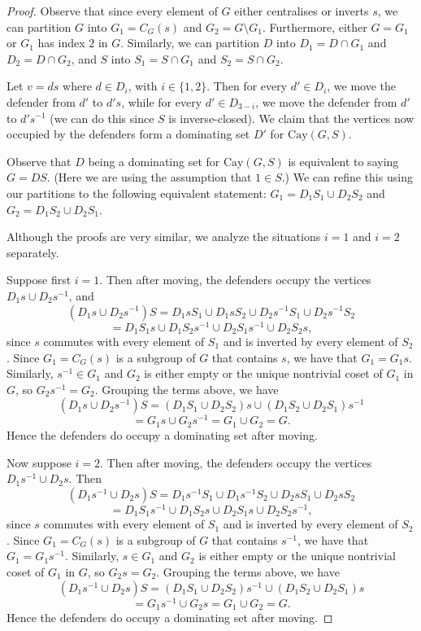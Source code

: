 \documentclass[10pt,a4paper]{amsart}
\newcommand{\Cay}[2]{\mathrm{Cay}(#1,#2)}		%
\begin{document}
\begin{proof}
    Observe that since every element of $G$ either centralises or inverts $s$, we can partition $G$ into $G_1=C_G(s)$ and $G_2=G \setminus G_1$. Furthermore, either $G=G_1$ or $G_1$ has index $2$ in $G$. Similarly, we can partition $D$ into $D_1=D\cap G_1$ and $D_2=D\cap G_2$, and $S$ into $S_1=S\cap G_1$ and $S_2=S\cap G_2$.

    Let $v=ds$ where $d \in D_i$, with $i \in \{1,2\}$. Then for every $d' \in D_i$, we move the defender from $d'$ to $d's$, while for every $d' \in D_{3-i}$, we move the defender from $d'$ to $d's^{-1}$ (we can do this since $S$ is inverse-closed). We claim that the vertices now occupied by the defenders form a dominating set $D'$ for $\Cay{G}{S}$.

    Observe that $D$ being a dominating set for $\Cay{G}{S}$ is equivalent to saying $G = DS$. (Here we are using the assumption that $1 \in S$.) We can refine this using our partitions to the following equivalent statement: $G_1=D_1S_1 \cup D_2S_2$ and $G_2=D_1S_2 \cup D_2S_1$.

    Although the proofs are very similar, we analyze the situations $i=1$ and $i=2$ separately. 

    Suppose first $i=1$. Then after moving, the defenders occupy the vertices $D_1s \cup D_2s^{-1}$, and $$(D_1s \cup D_2 s^{-1})S  = D_1sS_1 \cup D_1sS_2 \cup D_2s^{-1}S_1 \cup D_2s^{-1}S_2 $$
    $$ = D_1S_1s \cup D_1S_2s^{-1} \cup D_2S_1s^{-1}\cup D_2S_2s,$$ since $s$ commutes with every element of $S_1$ and is inverted by every element of $S_2$. Since $G_1 = C_G(s)$ is a subgroup of $G$ that contains $s$, we have that $G_1 = G_1s$. Similarly, $s^{-1}\in G_1$ and $G_2$ is either empty or the unique nontrivial coset of $G_1$ in $G$, so $G_2s^{-1}=G_2$. Grouping the terms above, we have 
    $$(D_1s\cup D_2s^{-1})S = (D_1S_1\cup D_2S_2)s \cup (D_1S_2\cup D_2S_1)s^{-1}$$
    $$ = G_1s\cup G_2s^{-1} = G_1\cup G_2 = G.$$
    Hence the defenders do occupy a dominating set after moving.
    
Now suppose $i=2$. Then after moving, the defenders occupy the vertices $D_1s^{-1} \cup D_2s$. 
Then $$(D_1s^{-1} \cup D_2 s)S  = D_1s^{-1}S_1 \cup D_1s^{-1}S_2 \cup D_2sS_1 \cup D_2sS_2$$
    $$ = D_1S_1s^{-1} \cup D_1S_2s \cup D_2S_1s\cup D_2S_2s^{-1},$$ since $s$ commutes with every element of $S_1$ and is inverted by every element of $S_2$. Since $G_1 = C_G(s)$ is a subgroup of $G$ that contains $s^{-1}$, we have that $G_1 = G_1s^{-1}$. Similarly, $s\in G_1$ and $G_2$ is either empty or the unique nontrivial coset of $G_1$ in $G$, so $G_2s=G_2$. Grouping the terms above, we have 
    $$(D_1s^{-1}\cup D_2s)S = (D_1S_1\cup D_2S_2)s^{-1} \cup (D_1S_2\cup D_2S_1)s $$ $$= G_1s^{-1}\cup G_2s = G_1\cup G_2 = G.$$
    Hence the defenders do occupy a dominating set after moving.
   \end{proof}
\end{document}
